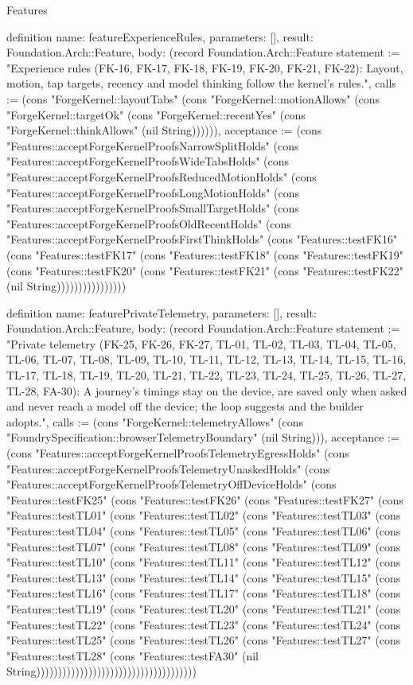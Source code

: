 \begin{lexlean}{Features}
\begin{semanticmodule}
definition{
  name: featureExperienceRules,
  parameters: [],
  result: Foundation.Arch::Feature,
  body: (record Foundation.Arch::Feature {statement := "Experience rules (FK-16, FK-17, FK-18, FK-19, FK-20, FK-21, FK-22): Layout, motion, tap targets, recency and model thinking follow the kernel's rules.", calls := (cons "ForgeKernel::layoutTabs" (cons "ForgeKernel::motionAllows" (cons "ForgeKernel::targetOk" (cons "ForgeKernel::recentYes" (cons "ForgeKernel::thinkAllows" (nil String)))))), acceptance := (cons "Features::acceptForgeKernelProofsNarrowSplitHolds" (cons "Features::acceptForgeKernelProofsWideTabsHolds" (cons "Features::acceptForgeKernelProofsReducedMotionHolds" (cons "Features::acceptForgeKernelProofsLongMotionHolds" (cons "Features::acceptForgeKernelProofsSmallTargetHolds" (cons "Features::acceptForgeKernelProofsOldRecentHolds" (cons "Features::acceptForgeKernelProofsFirstThinkHolds" (cons "Features::testFK16" (cons "Features::testFK17" (cons "Features::testFK18" (cons "Features::testFK19" (cons "Features::testFK20" (cons "Features::testFK21" (cons "Features::testFK22" (nil String)))))))))))))))})
}

definition{
  name: featurePrivateTelemetry,
  parameters: [],
  result: Foundation.Arch::Feature,
  body: (record Foundation.Arch::Feature {statement := "Private telemetry (FK-25, FK-26, FK-27, TL-01, TL-02, TL-03, TL-04, TL-05, TL-06, TL-07, TL-08, TL-09, TL-10, TL-11, TL-12, TL-13, TL-14, TL-15, TL-16, TL-17, TL-18, TL-19, TL-20, TL-21, TL-22, TL-23, TL-24, TL-25, TL-26, TL-27, TL-28, FA-30): A journey's timings stay on the device, are saved only when asked and never reach a model off the device; the loop suggests and the builder adopts.", calls := (cons "ForgeKernel::telemetryAllows" (cons "FoundrySpecification::browserTelemetryBoundary" (nil String))), acceptance := (cons "Features::acceptForgeKernelProofsTelemetryEgressHolds" (cons "Features::acceptForgeKernelProofsTelemetryUnaskedHolds" (cons "Features::acceptForgeKernelProofsTelemetryOffDeviceHolds" (cons "Features::testFK25" (cons "Features::testFK26" (cons "Features::testFK27" (cons "Features::testTL01" (cons "Features::testTL02" (cons "Features::testTL03" (cons "Features::testTL04" (cons "Features::testTL05" (cons "Features::testTL06" (cons "Features::testTL07" (cons "Features::testTL08" (cons "Features::testTL09" (cons "Features::testTL10" (cons "Features::testTL11" (cons "Features::testTL12" (cons "Features::testTL13" (cons "Features::testTL14" (cons "Features::testTL15" (cons "Features::testTL16" (cons "Features::testTL17" (cons "Features::testTL18" (cons "Features::testTL19" (cons "Features::testTL20" (cons "Features::testTL21" (cons "Features::testTL22" (cons "Features::testTL23" (cons "Features::testTL24" (cons "Features::testTL25" (cons "Features::testTL26" (cons "Features::testTL27" (cons "Features::testTL28" (cons "Features::testFA30" (nil String))))))))))))))))))))))))))))))))))))})
}


\end{semanticmodule}
\end{lexlean}

